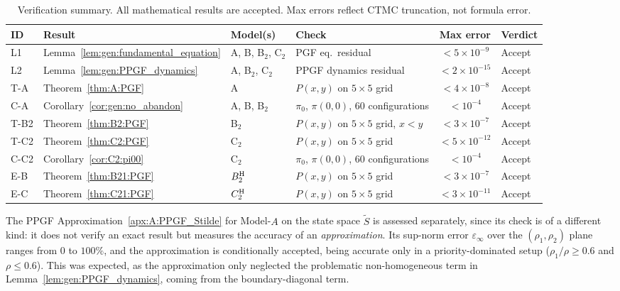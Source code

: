 \begin{table}[H]
    \centering
    \caption{Verification summary.  All mathematical results are accepted.  Max errors
    reflect CTMC truncation, not formula error.}
    \label{tab:validation_summary}
    \renewcommand{\arraystretch}{1.35}
    \footnotesize
    \begin{tabular}{llllcl}
        \hline
        \textbf{ID} & \textbf{Result} & \textbf{Model(s)} & \textbf{Check} & \textbf{Max error} & \textbf{Verdict} \\
        \hline
        L1   & Lemma~\ref{lem:gen:fundamental_equation}  & A, B, B$_2$, C$_2$ & PGF eq.\ residual             & $<5\times10^{-9}$  & Accept \\
        L2   & Lemma~\ref{lem:gen:PPGF_dynamics}         & A, B$_2$, C$_2$    & PPGF dynamics residual        & $<2\times10^{-15}$ & Accept \\
        T-A  & Theorem~\ref{thm:A:PGF}                     & A                  & $P(x,y)$ on $5\times5$ grid   & $<4\times10^{-8}$  & Accept \\
        C-A  & Corollary~\ref{cor:gen:no_abandon}        & A, B, B$_2$        & $\pi_0$, $\pi(0,0)$, 60 configurations  & $<10^{-4}$         & Accept \\
        T-B2 & Theorem~\ref{thm:B2:PGF}                  & B$_2$              & $P(x,y)$ on $5\times5$ grid, $x<y$   & $<3\times10^{-7}$  & Accept \\
        T-C2 & Theorem~\ref{thm:C2:PGF}                  & C$_2$              & $P(x,y)$ on $5\times5$ grid   & $<5\times10^{-12}$ & Accept \\
        C-C2 & Corollary~\ref{cor:C2:pi00}               & C$_2$              & $\pi_0$, $\pi(0,0)$, 60 configurations  & $<10^{-4}$         & Accept \\
        E-B  & Theorem~\ref{thm:B21:PGF}                 & $B_2^{\mathrm{H}}$            & $P(x,y)$ on $5\times5$ grid                 & $<3\times10^{-7}$  & Accept \\
        E-C  & Theorem~\ref{thm:C21:PGF}                 & $C_2^{\mathrm{H}}$            & $P(x,y)$ on $5\times5$ grid                 & $<3\times10^{-11}$ & Accept \\
        \hline
    \end{tabular}
\end{table}
The PPGF Approximation~\ref{apx:A:PPGF_Stilde} for Model-$A$ on the state space $\widetilde{S}$ is assessed separately, since its check is of a different kind: it does not verify an exact result but measures the accuracy of an \emph{approximation}. Its sup-norm error $\varepsilon_\infty$ over the $(\rho_1,\rho_2)$ plane ranges from $0$ to $100\%$, and the approximation is conditionally accepted, being accurate only in a priority-dominated setup ($\rho_1/\rho\ge0.6$ and $\rho\le0.6$). This was expected, as the approximation only neglected the problematic non-homogeneous term in Lemma~\ref{lem:gen:PPGF_dynamics}, coming from the boundary-diagonal term.


